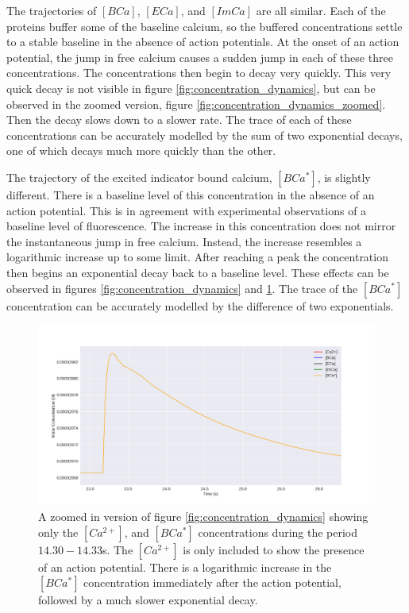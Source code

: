 \documentclass[a4paper,12pt]{article}
\theoremstyle{definition}
\begin{document}
The trajectories of $[BCa]$, $[ECa]$, and $[ImCa]$ are all similar. Each of the proteins buffer some of the baseline calcium, so the buffered concentrations settle to a stable baseline in the absence of action potentials. At the onset of an action potential, the jump in free calcium causes a sudden jump in each of these three concentrations. The concentrations then begin to decay very quickly. This very quick decay is not visible in figure \ref{fig:concentration_dynamics}, but can be observed in the zoomed version, figure \ref{fig:concentration_dynamics_zoomed}. Then the decay slows down to a slower rate. The trace of each of these concentrations can be accurately modelled by the sum of two exponential decays, one of which decays much more quickly than the other.

The trajectory of the excited indicator bound calcium, $[BCa^*]$, is slightly different. There is a baseline level of this concentration in the absence of an action potential. This is in agreement with experimental observations of a baseline level of fluorescence. The increase in this concentration does not mirror the instantaneous jump in free calcium. Instead, the increase resembles a logarithmic increase up to some limit. After reaching a peak the concentration then begins an exponential decay back to a baseline level. These effects can be observed in figures \ref{fig:concentration_dynamics} and \ref{fig:concentration_dynamics_zoomed_excited}. The trace of the $[BCa^*]$ concentration can be accurately modelled by the difference of two exponentials.

\begin{figure}[ht]
  \centering
  \includegraphics[width=\textwidth]{figures/concentration_dynamics_18_zoomed_excited.png}
  \caption{A zoomed in version of figure \ref{fig:concentration_dynamics} showing only the $[Ca^{2+}]$, and $[BCa^*]$ concentrations during the period $14.30 - 14.33$s. The $[Ca^{2+}]$ is only included to show the presence of an action potential. There is a logarithmic increase in the $[BCa^*]$ concentration immediately after the action potential, followed by a much slower exponential decay.}
  \label{fig:concentration_dynamics_zoomed_excited}
\end{figure}
\end{document}
